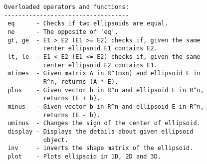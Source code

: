 \begin{enumerate}
\begin{lstlisting}
Overloaded operators and functions:
-----------------------------------
 eq      - Checks if two ellipsoids are equal.
 ne      - The opposite of 'eq'.
 gt, ge  - E1 > E2 (E1 >= E2) checks if, given the same
           center ellipsoid E1 contains E2.
 lt, le  - E1 < E2 (E1 <= E2) checks if, given the same
           center ellipsoid E2 contains E1.
 mtimes  - Given matrix A in R^(mxn) and ellipsoid E in
           R^n, returns (A * E).
 plus    - Given vector b in R^n and ellipsoid E in R^n,
           returns (E + b).
 minus   - Given vector b in R^n and ellipsoid E in R^n,
           returns (E - b).
 uminus  - Changes the sign of the center of ellipsoid.
 display - Displays the details about given ellipsoid
           object.
 inv     - inverts the shape matrix of the ellipsoid.
 plot    - Plots ellipsoid in 1D, 2D and 3D.



\end{lstlisting}
\end{enumerate}
